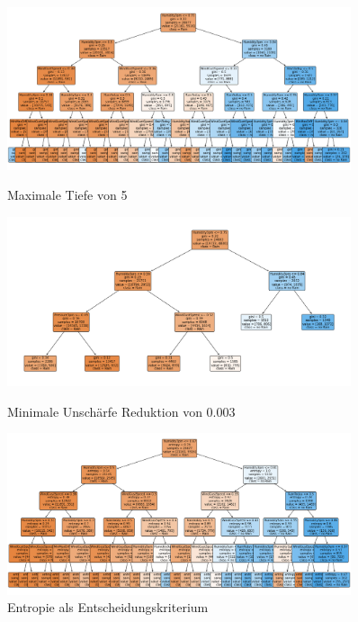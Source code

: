 \begin{figure}[H]
    \centering
     \begin{minipage}{0.30\textwidth}
        \centering
        \includegraphics[width=0.9\textwidth]{Bilder/treeMaxDepth} %
        \caption{Maximale Tiefe von 5}
        \label{fig:treeMaxDepth}
    \end{minipage}\hfill
    \begin{minipage}{0.30\textwidth}
        \centering
        \includegraphics[width=0.9\textwidth]{Bilder/treeMinImpurityDecrease} %
        \caption{Minimale Unschärfe Reduktion von 0.003}
        \label{fig:treeMinImpurityDecrease}
    \end{minipage}\hfill
    \begin{minipage}{0.30\textwidth}
        \centering
        \includegraphics[width=0.9\textwidth]{Bilder/treeCriterion} %
        \caption{Entropie als Entscheidungskriterium}
        \label{fig:treeCriterion}
    \end{minipage}
\end{figure}

